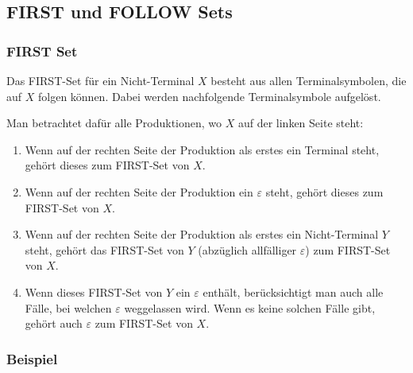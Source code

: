 \subsection{FIRST und FOLLOW Sets}

\subsubsection{FIRST Set}

Das FIRST-Set für ein Nicht-Terminal $X$ besteht aus allen Terminalsymbolen, die auf $X$ folgen können.
Dabei werden nachfolgende Terminalsymbole aufgelöst.

Man betrachtet dafür alle Produktionen, wo $X$ auf der linken Seite steht:

\begin{enumerate}
	\item Wenn auf der rechten Seite der Produktion als erstes ein Terminal steht, gehört dieses
		zum FIRST-Set von $X$.
	\item Wenn auf der rechten Seite der Produktion ein $\varepsilon$ steht, gehört dieses zum
		FIRST-Set von $X$.
	\item Wenn auf der rechten Seite der Produktion als erstes ein Nicht-Terminal $Y$ steht, gehört
		das FIRST-Set von $Y$ (abzüglich allfälliger $\varepsilon$) zum FIRST-Set von $X$.
	\item Wenn dieses FIRST-Set von $Y$ ein $\varepsilon$ enthält, berücksichtigt man auch alle Fälle,
		bei welchen $\varepsilon$ weggelassen wird. Wenn es keine solchen Fälle gibt, gehört auch
		$\varepsilon$ zum FIRST-Set von $X$.
\end{enumerate}

\subsubsection*{Beispiel}


